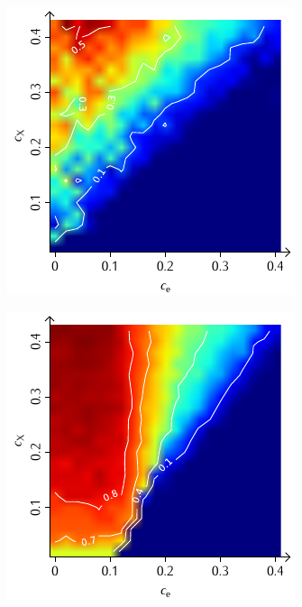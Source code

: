 \documentclass[a4paper, 10pt, twoside, openany]{book} %
\begin{document}
\begin{figure}
\begin{minipage}[t]{0.48\textwidth}
        \label{H_random_K}
    \end{minipage}
    \hfill
    \begin{minipage}[t]{0.48\textwidth}
        \includegraphics[width=\textwidth]{Abbildungen/Phasendiagramme/Konturen/H_penalty_random_K.pdf}
        \label{H_penalty_random_K}
    \end{minipage}
    \begin{minipage}[t]{0.48\textwidth}
        \includegraphics[width=\textwidth]{Abbildungen/Phasendiagramme/Konturen/H_individual_K.pdf}

\end{minipage}
\end{figure}
\end{document}
